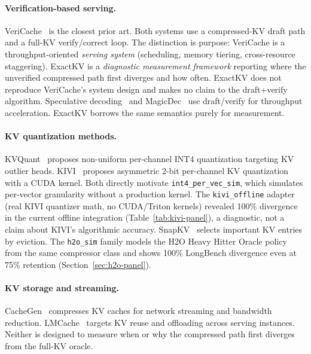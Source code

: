 \documentclass[11pt]{article}
\begin{document}
\paragraph{Verification-based serving.}
\begin{sloppypar}
VeriCache~\citep{vericache2026} is the closest prior art. Both systems use a
compressed-KV draft path and a full-KV verify/correct loop. The distinction is
purpose: VeriCache is a throughput-oriented \emph{serving system} (scheduling,
memory tiering, cross-resource staggering). ExactKV is a \emph{diagnostic
measurement framework} reporting where the unverified compressed path first
diverges and how often. ExactKV does not reproduce VeriCache's system design and
makes no claim to the draft+verify algorithm.
Speculative decoding~\citep{leviathan2023speculative} and
MagicDec~\citep{chen2024magicdec} use draft/verify for throughput acceleration. ExactKV borrows the same semantics purely for measurement.
\end{sloppypar}

\paragraph{KV quantization methods.}
\begin{sloppypar}
KVQuant~\citep{hooper2024kvquant} proposes non-uniform per-channel INT4 quantization
targeting KV outlier heads. KIVI~\citep{liu2024kivi} proposes asymmetric 2-bit
per-channel KV quantization with a CUDA kernel. Both directly motivate
\texttt{int4\_per\_vec\_sim}, which simulates per-vector granularity without a
production kernel. The \texttt{kivi\_offline} adapter (real KIVI quantizer math, no
CUDA/Triton kernels) revealed 100\% divergence in the current offline integration
(Table~\ref{tab:kivi-panel}), a diagnostic, not a claim about KIVI's algorithmic accuracy.
SnapKV~\citep{li2024snapkv} selects important KV entries by eviction. The
\texttt{h2o\_sim} family models the H2O Heavy Hitter Oracle
policy~\citep{zhang2023h2o} from the same compressor class and shows 100\%
LongBench divergence even at 75\% retention (Section~\ref{sec:h2o-panel}).
\end{sloppypar}

\paragraph{KV storage and streaming.}
CacheGen~\citep{liu2024cachegen} compresses KV caches for network streaming and
bandwidth reduction. LMCache~\citep{lmcache2025} targets KV reuse and offloading
across serving instances. Neither is designed to measure when or why the compressed
path first diverges from the full-KV oracle.
\end{document}
